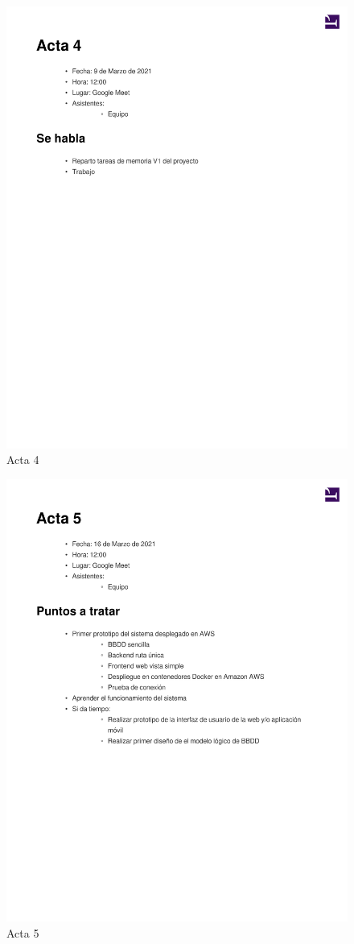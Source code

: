 \documentclass{article}
\begin{document}
\begin{figure}
   \includegraphics[width=.8\textwidth]{../../actas_reuniones/acta4.pdf}
   \caption{Acta 4}
\end{figure}
\begin{figure}
   \includegraphics[width=.8\textwidth]{../../actas_reuniones/acta5.pdf}
   \caption{Acta 5}
\end{figure}
\end{document}
